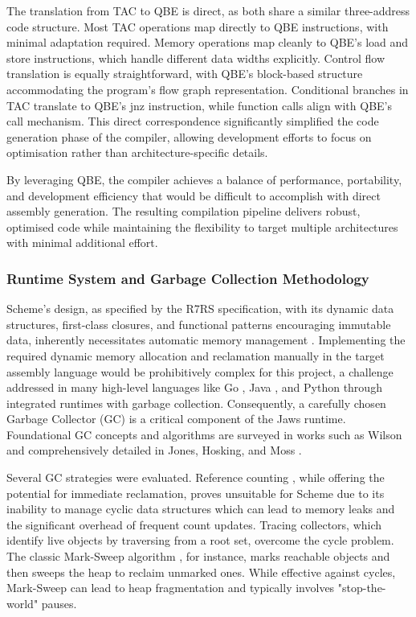 \documentclass[final]{cmpreport_02}
\begin{document}
The translation from TAC to QBE is direct, as both share a similar three-address code structure. Most TAC operations map directly to QBE instructions, with minimal adaptation required. Memory operations map cleanly to QBE's load and store instructions, which handle different data widths explicitly.
Control flow translation is equally straightforward, with QBE's block-based structure accommodating the program's flow graph representation. Conditional branches in TAC translate to QBE's jnz instruction, while function calls align with QBE's call mechanism. This direct correspondence significantly simplified the code generation phase of the compiler, allowing development efforts to focus on optimisation rather than architecture-specific details.\newline

By leveraging QBE, the compiler achieves a balance of performance, portability, and development efficiency that would be difficult to accomplish with direct assembly generation. The resulting compilation pipeline delivers robust, optimised code while maintaining the flexibility to target multiple architectures with minimal additional effort.

\subsubsection{Runtime System and Garbage Collection Methodology}
\label{sec:methodology_runtime_gc}

Scheme's design, as specified by the R7RS specification, with its dynamic data structures, first-class closures, and functional patterns encouraging immutable data, inherently necessitates automatic memory management \cite{JonesHoskingMoss2011}. Implementing the required dynamic memory allocation and reclamation manually in the target assembly language would be prohibitively complex for this project, a challenge addressed in many high-level languages like Go \cite{GoWebsite}, Java \cite{oracle2024java}, and Python \cite{PythonWebsite} through integrated runtimes with garbage collection. Consequently, a carefully chosen Garbage Collector (GC) is a critical component of the Jaws runtime. Foundational GC concepts and algorithms are surveyed in works such as Wilson \cite{Wilson1992} and comprehensively detailed in Jones, Hosking, and Moss \cite{JonesHoskingMoss2011}.\newline

Several GC strategies were evaluated. Reference counting \cite{Collins1960, JonesHoskingMoss2011}, while offering the potential for immediate reclamation, proves unsuitable for Scheme due to its inability to manage cyclic data structures which can lead to memory leaks and the significant overhead of frequent count updates. Tracing collectors, which identify live objects by traversing from a root set, overcome the cycle problem. The classic Mark-Sweep algorithm \cite{mccarthy1960recursive, JonesHoskingMoss2011}, for instance, marks reachable objects and then sweeps the heap to reclaim unmarked ones. While effective against cycles, Mark-Sweep can lead to heap fragmentation and typically involves "stop-the-world" pauses.\newline
\end{document}
